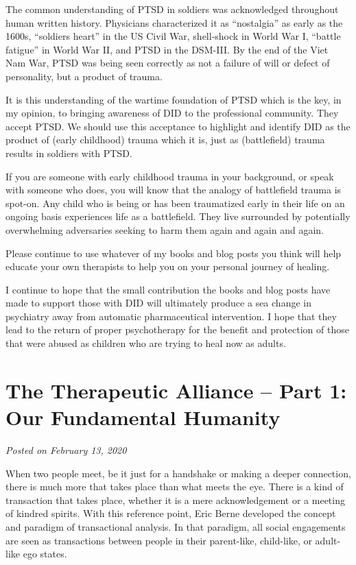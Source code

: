 \documentclass[]{book}
\begin{document}
The common understanding of PTSD in soldiers was acknowledged throughout human written history. Physicians characterized it as ``nostalgia'' as early as the 1600s, ``soldiers heart'' in the US Civil War, shell-shock in World War I, ``battle fatigue'' in World War II, and PTSD in the DSM-III. By the end of the Viet Nam War, PTSD was being seen correctly as not a failure of will or defect of personality, but a product of trauma.

It is this understanding of the wartime foundation of PTSD which is the key, in my opinion, to bringing awareness of DID to the professional community. They accept PTSD. We should use this acceptance to highlight and identify DID as the product of (early childhood) trauma which it is, just as (battlefield) trauma results in soldiers with PTSD.

If you are someone with early childhood trauma in your background, or speak with someone who does, you will know that the analogy of battlefield trauma is spot-on. Any child who is being or has been traumatized early in their life on an ongoing basis experiences life as a battlefield. They live surrounded by potentially overwhelming adversaries seeking to harm them again and again and again.

Please continue to use whatever of my books and blog posts you think will help educate your own therapists to help you on your personal journey of healing.

I continue to hope that the small contribution the books and blog posts have made to support those with DID will ultimately produce a sea change in psychiatry away from automatic pharmaceutical intervention. I hope that they lead to the return of proper psychotherapy for the benefit and protection of those that were abused as children who are trying to heal now as adults.

\hypertarget{the-therapeutic-alliance-part-1-our-fundamental-humanity}{%
\section{The Therapeutic Alliance -- Part 1: Our Fundamental Humanity}\label{the-therapeutic-alliance-part-1-our-fundamental-humanity}}

\emph{Posted on February 13, 2020}

When two people meet, be it just for a handshake or making a deeper connection, there is much more that takes place than what meets the eye. There is a kind of transaction that takes place, whether it is a mere acknowledgement or a meeting of kindred spirits. With this reference point, Eric Berne developed the concept and paradigm of transactional analysis. In that paradigm, all social engagements are seen as transactions between people in their parent-like, child-like, or adult-like ego states.
\end{document}
